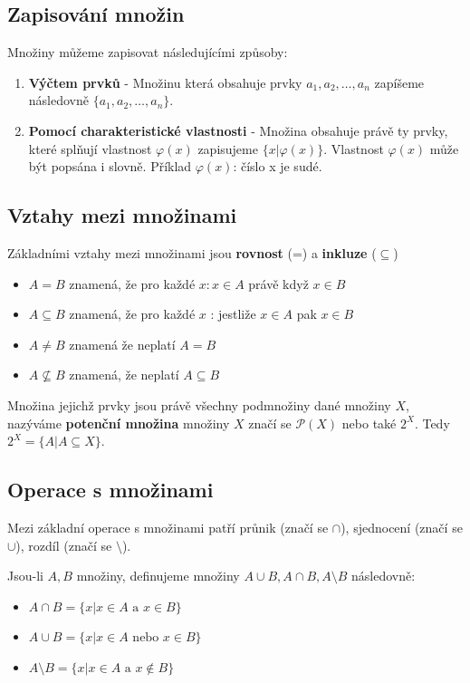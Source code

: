\documentclass[12pt,a4paper]{article}
\begin{document}
\subsection{Zapisování množin}
Množiny můžeme zapisovat následujícími způsoby:
\begin{enumerate}
	\item \textbf{Výčtem prvků} - Množinu která obsahuje prvky $a_1,a_2,\dots,a_n$ zapíšeme následovně $\{a_1,a_2,\dots,a_n\}$.
	\item \textbf{Pomocí charakteristické vlastnosti} - Množina obsahuje právě ty prvky, které splňují vlastnost $\varphi(x)$ zapisujeme $\{x | \varphi(x)\}$. Vlastnost $\varphi(x)$ může být popsána i slovně. Příklad $\varphi(x)$: číslo x je sudé.
\end{enumerate}
\subsection{Vztahy mezi množinami}
Základními vztahy mezi množinami jsou \textbf{rovnost} (=) a \textbf{inkluze} ($\subseteq$)
\begin{itemize}
	\item[] $A = B$ znamená, že pro každé $x : x \in A$ právě když $x \in B$
	\item[] $A \subseteq B$ znamená, že pro každé $x$ : jestliže $x \in A$ pak $x \in B$
	\item[] $A \not= B$ znamená že neplatí $A = B$
	\item[] $A \not\subseteq B$ znamená, že neplatí $A \subseteq B$
\end{itemize}

Množina jejichž prvky jsou právě všechny podmnožiny dané množiny $X$, nazýváme \textbf{potenční množina} množiny $X$ značí se $\mathscr{P}(X)$ nebo také $2^X$. Tedy $2^X = \{A|A\subseteq X\}$.

\subsection{Operace s množinami}
Mezi základní operace s množinami patří průnik (značí se $\cap$), sjednocení (značí se $\cup$), rozdíl (značí se $\setminus$).

Jsou-li $A,B$ množiny, definujeme množiny $A \cup B, A \cap B, A \setminus B$ následovně:
\begin{itemize}
	\item[] $A \cap B = \{ x|x \in A \text{ a } x \in B\}$
	\item[] $A \cup B = \{ x|x \in A \text{ nebo } x \in B\}$
	\item[] $A \setminus B = \{ x|x \in A \text{ a } x \not\in B\}$
\end{itemize}
\end{document}
